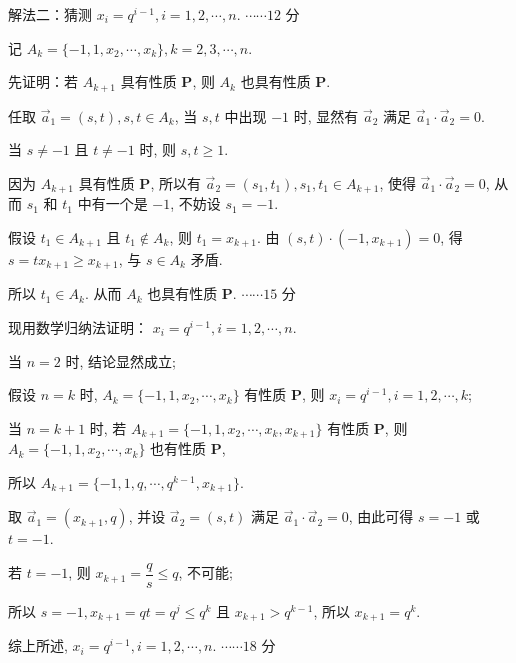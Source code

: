 \begin{solutions}
解法二：猜测 $x_i = q^{i-1}, i=1, 2, \cdots, n$. \hfill $\cdots\cdots 12$ 分

记 $A_k = \{-1, 1, x_2, \cdots, x_k\}, k=2, 3, \cdots, n$.

先证明：若 $A_{k+1}$ 具有性质 \textbf{P}, 则 $A_k$ 也具有性质 \textbf{P}.

任取 $\vec{a}_1 = (s, t), s, t \in A_k$, 当 $s, t$ 中出现 $-1$ 时, 显然有 $\vec{a}_2$ 满足 $\vec{a}_1 \cdot \vec{a}_2 = 0$.

当 $s \ne -1$ 且 $t \ne -1$ 时, 则 $s, t \ge 1$.

因为 $A_{k+1}$ 具有性质 \textbf{P}, 所以有 $\vec{a}_2 = (s_1, t_1), s_1, t_1 \in A_{k+1}$, 使得 $\vec{a}_1 \cdot \vec{a}_2 = 0$, 从而 $s_1$ 和 $t_1$ 中有一个是 $-1$, 不妨设 $s_1 = -1$.

假设 $t_1 \in A_{k+1}$ 且 $t_1 \notin A_k$, 则 $t_1 = x_{k+1}$. 由 $(s, t) \cdot (-1, x_{k+1}) = 0$, 得 $s = t x_{k+1} \ge x_{k+1}$, 与 $s \in A_k$ 矛盾.

所以 $t_1 \in A_k$. 从而 $A_k$ 也具有性质 \textbf{P}. \hfill $\cdots\cdots 15$ 分

现用数学归纳法证明： $x_i = q^{i-1}, i=1, 2, \cdots, n$.

当 $n=2$ 时, 结论显然成立;

假设 $n=k$ 时, $A_k = \{-1, 1, x_2, \cdots, x_k\}$ 有性质 \textbf{P}, 则 $x_i = q^{i-1}, i=1, 2, \cdots, k$;

当 $n=k+1$ 时, 若 $A_{k+1} = \{-1, 1, x_2, \cdots, x_k, x_{k+1}\}$ 有性质 \textbf{P}, 则 $A_k = \{-1, 1, x_2, \cdots, x_k\}$ 也有性质 \textbf{P},

所以 $A_{k+1} = \{-1, 1, q, \cdots, q^{k-1}, x_{k+1}\}$.

取 $\vec{a}_1 = (x_{k+1}, q)$, 并设 $\vec{a}_2 = (s, t)$ 满足 $\vec{a}_1 \cdot \vec{a}_2 = 0$, 由此可得 $s = -1$ 或 $t = -1$.

若 $t = -1$, 则 $x_{k+1} = \dfrac{q}{s} \le q$, 不可能;

所以 $s = -1, x_{k+1} = qt = q^j \le q^k$ 且 $x_{k+1} > q^{k-1}$, 所以 $x_{k+1} = q^k$.

综上所述, $x_i = q^{i-1}, i=1, 2, \cdots, n$. \hfill $\cdots\cdots 18$ 分
\end{solutions}